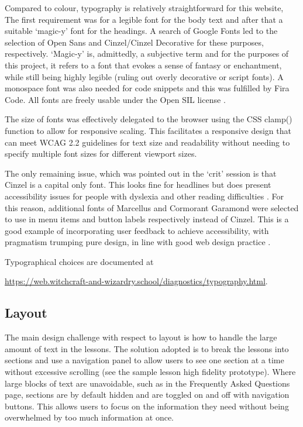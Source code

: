 \documentclass[a4paper, 12pt]{article}
\begin{document}
Compared to colour, typography is relatively straightforward for this website, The first requirement was for a legible font for the body text and after that a suitable `magic-y' font for the headings. A search of Google Fonts \citep{googlefonts2026} led to the selection of Open Sans and Cinzel/Cinzel Decorative for these purposes, respectively. `Magic-y' is, admittedly, a subjective term and for the purposes of this project, it refers to a font that evokes a sense of fantasy or enchantment, while still being highly legible (ruling out overly decorative or script fonts). A monospace font was also needed for code snippets and this was fulfilled by Fira Code. All fonts are freely usable under the Open SIL license \citep{silofl2007}.

The size of fonts was effectively delegated to the browser using the CSS clamp() function to allow for responsive scaling. This facilitates a responsive design that can meet WCAG 2.2 guidelines for text size and readability \citep{caldwell2024} without needing to specify multiple font sizes for different viewport sizes.

The only remaining issue, which was pointed out in the `crit' session is that Cinzel is a capital only font. This looks fine for headlines but does present accessibility issues for people with dyslexia and other reading difficulties \citep{rello2013dyslexia}. For this reason, additional fonts of Marcellus and Cormorant Garamond were selected to use in menu items and button labels respectively instead of Cinzel. This is a good example of incorporating user feedback to achieve accessibility, with pragmatism trumping pure design, in line with good web design practice \citep{norman2013design}.

Typographical choices are documented at 

\url{https://web.witchcraft-and-wizardry.school/diagnostics/typography.html}.

\subsection{Layout}
The main design challenge with respect to layout is how to handle the large amount of text in the lessons. The solution adopted is to break the lessons into sections and use a navigation panel to allow users to see one section at a time without excessive scrolling (see the sample lesson high fidelity prototype). Where large blocks of text are unavoidable, such as in the Frequently Asked Questions page, sections are by default hidden and are toggled on and off with navigation buttons. This allows users to focus on the information they need without being overwhelmed by too much information at once.
\end{document}
